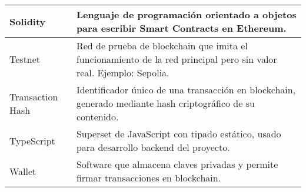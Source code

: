 \begin{longtable}{|p{3.5cm}|p{10.5cm}|}
Solidity & Lenguaje de programación orientado a objetos para escribir Smart Contracts en Ethereum. \\ \hline
Testnet & Red de prueba de blockchain que imita el funcionamiento de la red principal pero sin valor real. Ejemplo: Sepolia. \\ \hline
Transaction Hash & Identificador único de una transacción en blockchain, generado mediante hash criptográfico de su contenido. \\ \hline
TypeScript & Superset de JavaScript con tipado estático, usado para desarrollo backend del proyecto. \\ \hline
Wallet & Software que almacena claves privadas y permite firmar transacciones en blockchain. \\ \hline
\end{longtable}
